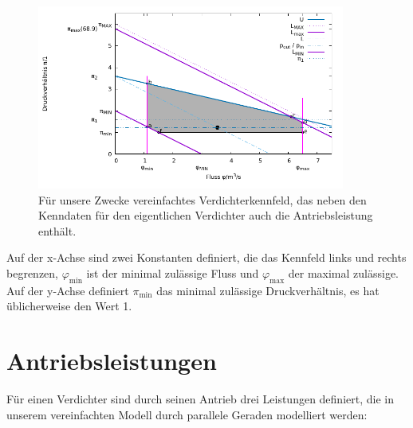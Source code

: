 \documentclass{article}
\newcommand{\pimin}{\pi_\text{min}}
\newcommand{\phimax}{\varphi_\text{max}}
\begin{document}
\begin{figure}[!ht]
\includegraphics[width=0.9\textwidth]{Example_Compressor_Wheel_Map.pdf}
\caption{Für unsere Zwecke vereinfachtes Verdichterkennfeld, das neben den Kenndaten für den eigentlichen Verdichter auch die Antriebsleistung enthält.}
\label{fig:kf}
\end{figure}



Auf der x-Achse sind zwei Konstanten definiert, die das Kennfeld links und rechts begrenzen, 
$\varphi_\text{min}$ ist der minimal zulässige Fluss und $\phimax$ der maximal zulässige. Auf der y-Achse definiert $\pimin$ das minimal zulässige Druckverhältnis, es hat üblicherweise den Wert 1.

\section{Antriebsleistungen}

Für einen Verdichter sind durch seinen Antrieb drei Leistungen definiert, die in unserem vereinfachten Modell durch parallele Geraden modelliert werden:
\end{document}
